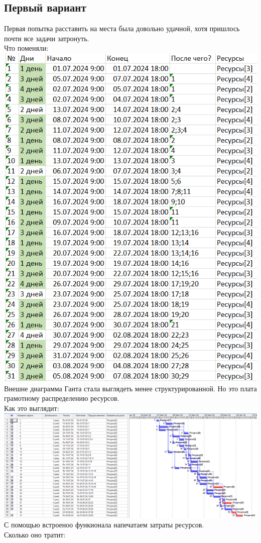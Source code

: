 \documentclass[14pt]{article}
\begin{document}
	\subsection{Первый вариант}
		Первая попытка расставить на места была довольно удачной, хотя пришлось почти все задачи затронуть.\\
		{\LARGE Что поменяли:}\\
		\includegraphics[height=0.6\textheight]{../img/1a1_days_change.png}\\ 
		Внешне диаграмма Ганта стала выглядеть менее структурированной.
		Но это плата грамотному распределению ресурсов.\\
		{\LARGE Как это выглядит:}\\
		\includegraphics[width=\textwidth]{../img/ot1a1_1.png}\\ 
		С помощью встроеноо функионала напечатаем затраты ресурсов.\\
		{\LARGE Сколько оно тратит:}\\
		
\end{document}
